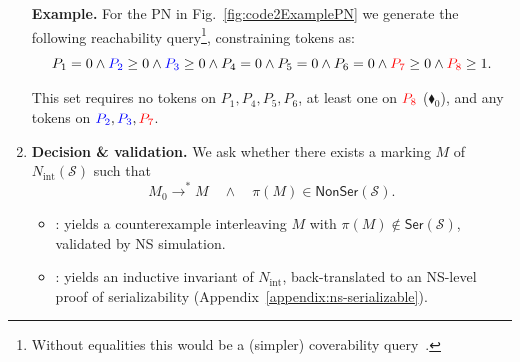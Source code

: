 \begin{enumerate}
	\begin{tcolorbox}[colback=black!5!white, colframe=black, boxrule=1pt]
\textbf{Example.}
For the PN in Fig.~\ref{fig:code2ExamplePN} we generate the following reachability query\footnote{Without equalities this would be a (simpler) coverability query~\cite{Ra78}.}, constraining tokens as:
	\[
	P_1 = 0 \wedge 
	\textcolor{blue}{P_2} \ge 0 \wedge \textcolor{blue}{P_3} \ge 0  \wedge P_4 = 0
	\wedge P_5 = 0 \wedge P_6 = 0 \wedge \textcolor{red}{P_7} \ge 0 \wedge \textcolor{red}{P_8} \ge 1.
	\]
	
This set requires no tokens on $P_1,P_4,P_5,P_6$, at least one on $\textcolor{red}{P_8}$ ($\blacklozenge_0$), and any tokens on $\textcolor{blue}{P_2},\textcolor{blue}{P_3},\textcolor{red}{P_7}$. 
	\end{tcolorbox} 
	
	
	
	
	\item \textbf{Decision \& validation.}
	We ask whether there exists a marking \(M\) of \(N_{\mathrm{int}}(\mathcal S)\) such that
	\[
	M_0 \xrightarrow{}^{*} M
	\quad\wedge\quad
	\pi(M)\in \mathsf{NonSer}(\mathcal S).
	\]
	
	\begin{itemize}
		\item [\sat]: yields a counterexample interleaving \(M\) with
		\(\pi(M)\notin \mathsf{Ser}(\mathcal S)\), validated by NS simulation.
		
		\item [\unsat]: yields an inductive invariant of
		\(N_{\mathrm{int}}\), back-translated to an NS-level proof of serializability (Appendix~\ref{appendix:ns-serializable}).
	\end{itemize}


\end{enumerate}
